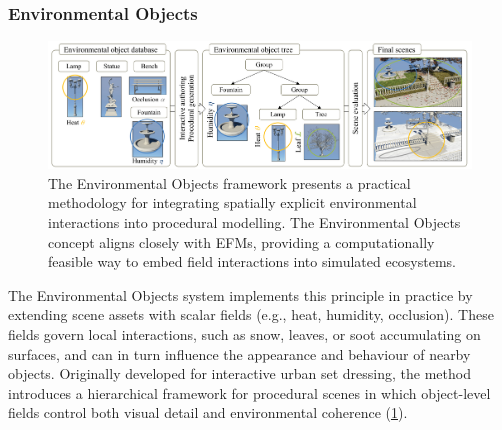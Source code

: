 \subsubsection{Environmental Objects}

\begin{figure}
    \includegraphics[]{env-objs-Grosbellet2016.png}
    \caption{The Environmental Objects framework \cite{Grosbellet2016} presents a practical methodology for integrating spatially explicit environmental interactions into procedural modelling. The Environmental Objects concept aligns closely with EFMs, providing a computationally feasible way to embed field interactions into simulated ecosystems.}
    \label{fig:env-obj-teaser-grosbellet2016}
\end{figure}

The Environmental Objects system \cite{Grosbellet2016} implements this principle in practice by extending scene assets with scalar fields (e.g., heat, humidity, occlusion). These fields govern local interactions, such as snow, leaves, or soot accumulating on surfaces, and can in turn influence the appearance and behaviour of nearby objects. Originally developed for interactive urban set dressing, the method introduces a hierarchical framework for procedural scenes in which object-level fields control both visual detail and environmental coherence (\cref{fig:env-obj-teaser-grosbellet2016}).




